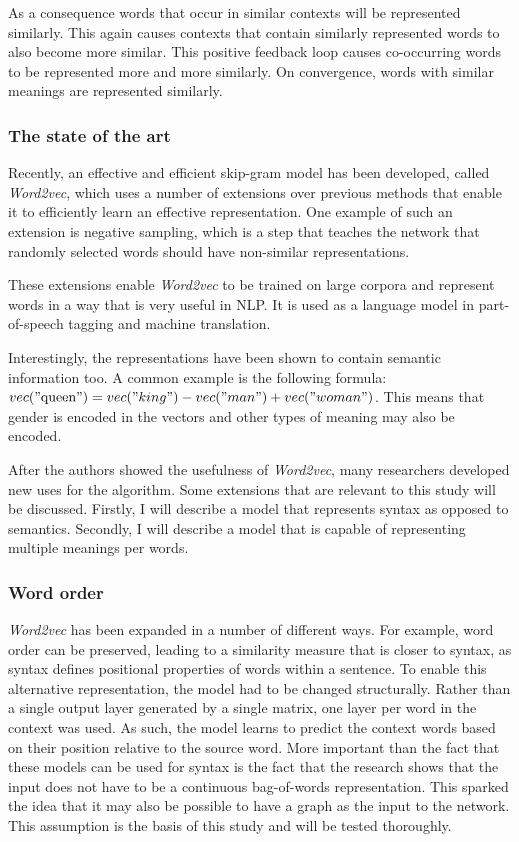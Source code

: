 \documentclass{article}
\begin{document}
 As a consequence words that occur in similar contexts will be represented similarly. This again causes contexts that contain similarly represented words to also become more similar. This positive feedback loop causes co-occurring words to be represented more and more similarly. On convergence, words with similar meanings are represented similarly.

 \subsubsection{The state of the art}
 Recently, an effective and efficient skip-gram model has been developed, called \emph{Word2vec}, which uses a number of extensions over previous methods that enable it to efficiently learn an effective representation\cite{w2v}. One example of such an extension is negative sampling, which is a step that teaches the network that randomly selected words should have non-similar representations.
 
 These extensions enable \emph{Word2vec} to be trained on large corpora and represent words in a way that is very useful in NLP. It is used as a language model in part-of-speech tagging and machine translation.
 
 Interestingly, the representations have been shown to contain semantic information too. A common example is the following formula: $vec("\text{queen}") = vec("king") - vec("man") + vec("woman")$. This means that gender is encoded in the vectors and other types of meaning may also be encoded.
 
 After the authors showed the usefulness of \emph{Word2vec}, many researchers developed new uses for the algorithm. Some extensions that are relevant to this study will be discussed. Firstly, I will describe a model that represents syntax as opposed to semantics. Secondly, I will describe a model that is capable of representing multiple meanings per words.
 
 \subsubsection{Word order} \label{wordorder}
 \emph{Word2vec} has been expanded in a number of different ways. For example, word order can be preserved, leading to a similarity measure that is closer to syntax, as syntax defines positional properties of words within a sentence\cite{ling2015}. To enable this alternative representation, the model had to be changed structurally. Rather than a single output layer generated by a single matrix, one layer per word in the context was used. As such, the model learns to predict the context words based on their position relative to the source word. More important than the fact that these models can be used for syntax is the fact that the research shows that the input does not have to be a continuous bag-of-words representation. This sparked the idea that it may also be possible to have a graph as the input to the network. This assumption is the basis of this study and will be tested thoroughly.
 
\end{document}
